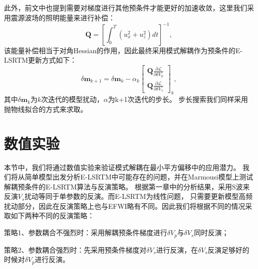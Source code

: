 此外，前文中也提到需要对梯度进行其他预条件才能更好的加速收敛，这里我们采用震源波场的照明能量来进行补偿：
\begin{equation}
	\mathbf{Q} =\left[\int^T_0(u^2_x+u^2_z)dt\right]^{-1},
    \label{eq:Gradient_Illumination_LSRTM}
\end{equation}
该能量补偿相当于对角Hessian的作用，因此最终采用模式解耦作为预条件的E-LSRTM更新方式如下：
\begin{equation}
        \delta\mathbf{m}_{k+1}=\delta\mathbf{m}_{k}-\alpha_k
        \begin{bmatrix}\mathbf{Q}{\frac{\partial\mathcal{L}}{\partial \delta V_p}}\\
		\mathbf{Q}{\frac{\partial\mathcal{L}}{\partial \delta V_s}}\end{bmatrix}_{k},
        \label{eq:Gradientmethod}
\end{equation}
其中$\delta\mathbf{m}_{k}$为$k$次迭代的模型扰动，$\alpha$为k+1次迭代的步长。
步长搜索我们同样采用抛物线拟合的方式来求取。
\section{数值实验}
本节中，我们将通过数值实验来验证模式解耦在最小平方偏移中的应用潜力。
我们将从简单模型出发分析E-LSRTM中可能存在的问题，并在Marmousi模型上测试解耦预条件的E-LSRTM算法与反演策略。
根据第一章中的分析结果，采用S波来反演$V_s$扰动等同于单参数的反演。而E-LSRTM为线性问题，
只需要更新模型高频扰动部分，因此在反演策略上也与EFWI略有不同。因此我们将根据不同的情况采取如下两种不同的反演策略：

策略1、参数耦合不强烈时：采用解耦预条件梯度进行$\delta V_p$与$\delta V_s$同时反演；

策略2、参数耦合强烈时：先采用预条件梯度对$\delta V_s$进行反演，在$\delta V_s$反演足够好的时候对$\delta V_p$进行反演。
